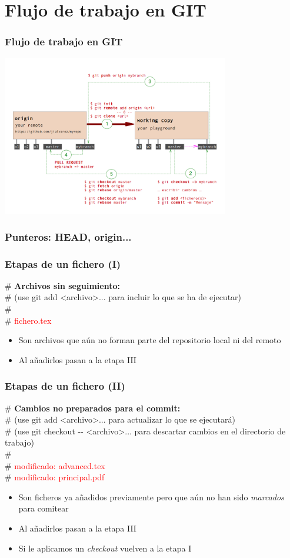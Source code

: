 \section{Flujo de trabajo en GIT}
\frame
{
\frametitle{Flujo de trabajo en GIT}
\begin{center}
 \includegraphics[height=7cm]{imgs/gitworkflow.png}
\end{center}
}

\frame
{
\frametitle{Punteros: HEAD, origin...}
}

\frame
{
\frametitle{Etapas de un fichero (I)}
\begin{framed}
\# \textbf{Archivos sin seguimiento:}\\
\#   (use git add <archivo>... para incluir lo que se ha de ejecutar)\\
\#\\
\#	\textcolor{red}{fichero.tex}
\end{framed}

\begin{itemize}
 \item Son archivos que aún no forman parte del repositorio local ni del remoto
 \item Al añadirlos pasan a la etapa III
\end{itemize}
}

\frame
{
\frametitle{Etapas de un fichero (II)}
\begin{framed}
\# \textbf{Cambios no preparados para el commit:}\\
\#   (use git add <archivo>... para actualizar lo que se ejecutará)\\
\#   (use git checkout -{}- <archivo>... para descartar cambios en el directorio de trabajo)\\
\#\\
\#	\textcolor{red}{modificado:   advanced.tex}\\
\#	\textcolor{red}{modificado:   principal.pdf}\\
\end{framed}

\begin{itemize}
 \item Son ficheros ya añadidos previamente pero que aún no han sido \textit{marcados} para comitear
 \item Al añadirlos pasan a la etapa III
 \item Si le aplicamos un \textit{checkout} vuelven a la etapa I
\end{itemize}
}

